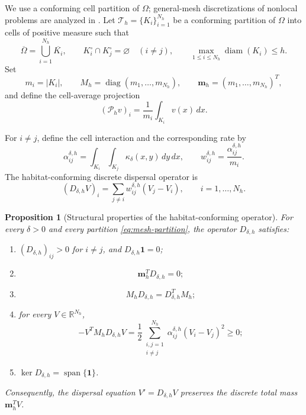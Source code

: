 \documentclass[11pt]{article}
\newtheorem{proposition}[theorem]{Proposition}
\theoremstyle{definition}
\newcommand{\R}{\mathbb{R}}
\newcommand{\diag}{\operatorname{diag}}
\newcommand{\one}{\mathbf{1}}
\begin{document}
We use a conforming cell partition of $\Omega$; general-mesh discretizations
of nonlocal problems are analyzed in \cite{TianDu2013,TianDuDG2015}.  Let $\mathcal T_h=\{K_i\}_{i=1}^{N_h}$ be a conforming partition of $\Omega$ into cells of positive measure such that
\begin{equation}
\label{eq:mesh-partition}
 \overline\Omega
 =\bigcup_{i=1}^{N_h}\overline{K_i},
 \qquad
 K_i^\circ\cap K_j^\circ=\varnothing
 \quad(i\ne j),
 \qquad
 \max_{1\le i\le N_h}\operatorname{diam}(K_i)\le h.
\end{equation}
Set
\[
 m_i=|K_i|,\qquad
 M_h=\diag(m_1,\ldots,m_{N_h}),\qquad
 \mathbf m_h=(m_1,\ldots,m_{N_h})^T,
\]
and define the cell-average projection
\begin{equation}
\label{eq:cell-average}
 (\mathcal P_hv)_i
 =\frac1{m_i}\int_{K_i}v(x)\,dx.
\end{equation}

For $i\ne j$, define the cell interaction and the corresponding rate by
\begin{equation}
\label{eq:cell-interactions}
 \alpha_{ij}^{\delta,h}
 =
 \int_{K_i}\int_{K_j}\kappa_\delta(x,y)\,dy\,dx,
 \qquad
 w_{ij}^{\delta,h}
 =\frac{\alpha_{ij}^{\delta,h}}{m_i}.
\end{equation}
The habitat-conforming discrete dispersal operator is
\begin{equation}
\label{eq:general-Dh}
 (D_{\delta,h}V)_i
 =
 \sum_{j\ne i}
 w_{ij}^{\delta,h}(V_j-V_i),
 \qquad i=1,\ldots,N_h.
\end{equation}


\begin{proposition}[Structural properties of the habitat-conforming operator]
\label{prop:habitat-structure}
For every $\delta>0$ and every partition \eqref{eq:mesh-partition}, the operator $D_{\delta,h}$ satisfies:
\begin{enumerate}[label=(\roman*)]
\item $(D_{\delta,h})_{ij}>0$ for $i\ne j$, and $D_{\delta,h}\one=0$;
\item
\begin{equation}
\label{eq:discrete-mass}
 \mathbf m_h^TD_{\delta,h}=0;
\end{equation}
\item
\begin{equation}
\label{eq:weighted-symmetry}
 M_hD_{\delta,h}=D_{\delta,h}^TM_h;
\end{equation}
\item for every $V\in\R^{N_h}$,
\begin{equation}
\label{eq:habitat-energy}
 -V^TM_hD_{\delta,h}V
 =
 \frac12\sum_{\substack{i,j=1\\ i\ne j}}^{N_h}
 \alpha_{ij}^{\delta,h}(V_i-V_j)^2
 \ge0;
\end{equation}
\item $\ker D_{\delta,h}=\operatorname{span}\{\one\}$.
\end{enumerate}
Consequently, the dispersal equation $V' = D_{\delta,h}V$ preserves the discrete total mass $\mathbf m_h^TV$.
\end{proposition}
\end{document}
